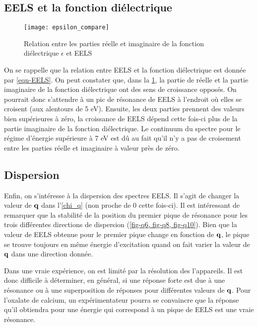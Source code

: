 \subsection{EELS et la fonction diélectrique}

\begin{figure}[!h]\label{fig-epsilon_compare}
    \centering
    \texttt{[image: epsilon\_compare]}
    \caption{Relation entre les parties réelle et imaginaire de la fonction diélectrique $\epsilon$ et EELS}
\end{figure}

On se rappelle que la relation entre EELS et la fonction diélectrique est donnée par \cref{eqn-EELS}.
On peut constater que, dans la \cref{fig-epsilon_compare}, la partie de réelle et
la partie imaginaire de la fonction diélectrique ont des sens de croissance opposés.
On pourrait donc s'attendre à un pic de résonance de EELS à l'endroit où elles se croisent
(aux alentours de 5 eV).
Ensuite, les deux parties prennent des valeurs bien supérieures à zéro,
la croissance de EELS dépend cette fois-ci plus de la partie imaginaire de la fonction diélectrique.
Le continuum du spectre pour le régime d'énergie supérieure à 7 eV est dû au fait
qu'il n'y a pas de croisement entre les parties réelle et imaginaire à valeur près de zéro.

\subsection{Dispersion}
Enfin, on s'intéresse à la dispersion des spectres EELS\@.
Il s'agit de changer la valeur de $\vb{q}$ dans l'\cref{chi_q} (non proche de 0 cette fois-ci).
Il est intéressant de remarquer que la stabilité de la position du premier pique de résonance
pour les trois différentes directions de dispersion (\cref{fig-q6, fig-q8, fig-q10}).
Bien que la valeur de EELS obtenue pour le premier pique change en fonction de $\vb{q}$,
le pique se trouve toujours en même énergie d'excitation
quand on fait varier la valeur de $\vb{q}$ dans une direction donnée.

Dans une vraie expérience, on est limité par la résolution des l'appareils.
Il est donc difficile à déterminer, en général, si une réponse forte est due
à une résonance ou à une superposition de réponses pour différentes valeurs de $\vb{q}$.
Pour l'oxalate de calcium, un expérimentateur pourra se convaincre que la réponse qu'il obtiendra
pour une énergie qui correspond à un pique de EELS est une vraie résonance.


